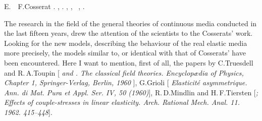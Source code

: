 E.~~F.\;Cosserat
.
\ru{,}
,
.
,
,
~,
.

The research in the field of the general theories of continuous media conducted in the last fifteen years,
drew the attention of the scientists to the Cosserats’ work.
Looking for the new models,
describing the behaviour of the real elastic media more precisely,
the models similar to, or identical with that of Cosserats’
have been encountered.
Here I want to mention, first of all,
the papers
by C.\:Truesdell and R.\,A.\;Toupin
[\textit{ 
and .
The classical field theories.
Encyclopædia of Physics, Chapter 1, Springer\hbox{-}Verlag, Berlin, 1960 }],
%
G.\:Grioli [\textit{ Elasticité asymmetrique. Ann. di Mat. Pura et Appl. Ser. IV, 50 (1960)}],
R.\,D.\;Mindlin and H.\,F.\;Tiersten
[\textit{;
Effects of couple-stresses in linear elasticity. Arch. Rational Mech. Anal. 11. 1962. 415\hbox{--}448}].


